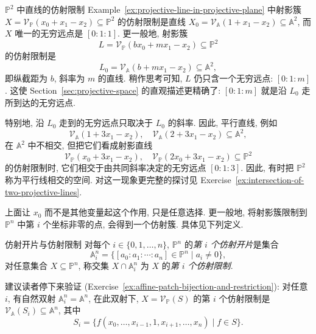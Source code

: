 \begin{Example}{$\mathbb{P}^{2}$ 中直线的仿射限制}\leavevmode\label{ex:affine-restrictions-of-projective-lines}
Example~\ref{ex:projective-line-in-projective-plane} 中射影簇 $X=\mathcal{V}_{\mathbb{P}}(x_{0}+x_{1}-x_{2})\subseteq\mathbb{P}^{2}$ 的仿射限制是直线 $X_{0}=\mathcal{V}_{\mathbb{A}}(1+x_{1}-x_{2})\subseteq\mathbb{A}^{2}$, 而 $X$ 唯一的无穷远点是 $[0:1:1]$. 更一般地, 射影簇
\[
  L=\mathcal{V}_{\mathbb{P}}(bx_{0}+mx_{1}-x_{2})\subseteq\mathbb{P}^{2}
\]
的仿射限制是
\[
  L_{0}=\mathcal{V}_{\mathbb{A}}(b+mx_{1}-x_{2})\subseteq\mathbb{A}^{2},
\]
即纵截距为 $b$, 斜率为 $m$ 的直线. 稍作思考可知, $L$ 仍只含一个无穷远点: $[0:1:m]$. 这使 Section~\ref{sec:projective-space} 的直观描述更精确了: $[0:1:m]$ 就是\textquotedbl{}沿 $L_{0}$ 走\textquotedbl{}所到达的无穷远点.

特别地, 沿 $L_{0}$ 走到的无穷远点只取决于 $L_{0}$ 的斜率. 因此, 平行直线, 例如
\[
  \mathcal{V}_{\mathbb{A}}(1+3x_{1}-x_{2}),\quad
  \mathcal{V}_{\mathbb{A}}(2+3x_{1}-x_{2})\subseteq\mathbb{A}^{2},
\]
在 $\mathbb{A}^{2}$ 中不相交, 但把它们看成射影直线
\[
  \mathcal{V}_{\mathbb{P}}(x_{0}+3x_{1}-x_{2}),\quad
  \mathcal{V}_{\mathbb{P}}(2x_{0}+3x_{1}-x_{2})\subseteq\mathbb{P}^{2}
\]
的仿射限制时, 它们相交于由共同斜率决定的无穷远点 $[0:1:3]$. 因此, 有时把 $\mathbb{P}^{2}$ 称为\textquotedbl{}平行线相交\textquotedbl{}的空间. 对这一现象更完整的探讨见 Exercise~\ref{ex:intersection-of-two-projective-lines}.
\end{Example}

上面让 $x_{0}$ 而不是其他变量起这个作用, 只是任意选择. 更一般地, 将射影簇限制到 $\mathbb{P}^{n}$ 中第 $i$ 个坐标非零的点, 会得到一个仿射簇. 具体见下列定义.

\begin{Definition}{仿射开片与仿射限制}\leavevmode\label{def:affine-patches-and-restrictions}
对每个 $i\in\{0,1,\ldots,n\}$, $\mathbb{P}^{n}$ 的\emph{第 $i$ 个仿射开片}是集合
\[
  \mathbb{A}_{i}^{n}=\{[a_{0}:a_{1}:\cdots:a_{n}]\in\mathbb{P}^{n}\mid a_{i}\neq0\},
\]
对任意集合 $X\subseteq\mathbb{P}^{n}$, 称交集 $X\cap\mathbb{A}_{i}^{n}$ 为 $X$ 的\emph{第 $i$ 个仿射限制}.
\end{Definition}

建议读者停下来验证 (Exercise~\ref{ex:affine-patch-bijection-and-restriction}): 对任意 $i$, 有自然双射 $\mathbb{A}_{i}^{n}=\mathbb{A}^{n}$, 在此双射下, $X=\mathcal{V}_{\mathbb{P}}(S)$ 的第 $i$ 个仿射限制是 $\mathcal{V}_{\mathbb{A}}(S_{i})\subseteq\mathbb{A}^{n}$, 其中
\[
  S_{i}=\{f(x_{0},\ldots,x_{i-1},1,x_{i+1},\ldots,x_{n})\mid f\in S\}.
\]

